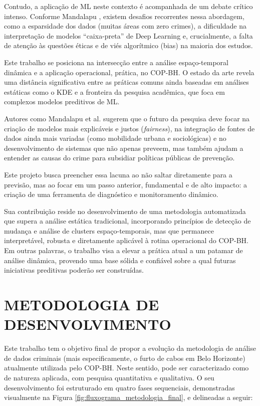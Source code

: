 Contudo, a aplicação de ML neste contexto é acompanhada de um debate crítico intenso. Conforme Mandalapu \cite{Mandalapu2023}, existem desafios recorrentes nessa abordagem, como a esparsidade dos dados (muitas áreas com zero crimes), a dificuldade na interpretação de modelos ``caixa-preta'' de Deep Learning e, crucialmente, a falta de atenção às questões éticas e de viés algorítmico (bias) na maioria dos estudos.

Este trabalho se posiciona na intersecção entre a análise espaço-temporal dinâmica e a aplicação operacional, prática, no COP-BH. O estado da arte revela uma distância significativa entre as práticas comuns ainda baseadas em análises estáticas como o KDE e a fronteira da pesquisa acadêmica, que foca em complexos modelos preditivos de ML. 

Autores como Mandalapu et al. \cite{Mandalapu2023} sugerem que o futuro da pesquisa deve focar na criação de modelos mais explicáveis e justos (\textit{fairness}), na integração de fontes de dados ainda mais variadas (como mobilidade urbana e sociológicas) e no desenvolvimento de sistemas que não apenas preveem, mas também ajudam a entender as causas do crime para subsidiar políticas públicas de prevenção.

Este projeto busca preencher essa lacuna ao não saltar diretamente para a previsão, mas ao focar em um passo anterior, fundamental e de alto impacto: a criação de uma ferramenta de diagnóstico e monitoramento dinâmico. 

Sua contribuição reside no desenvolvimento de uma metodologia automatizada que supera a análise estática tradicional, incorporando princípios de detecção de mudança e análise de clusters espaço-temporais, mas que permanece interpretável, robusta e diretamente aplicável à rotina operacional do COP-BH. Em outras palavras, o trabalho visa a elevar a prática atual a um patamar de análise dinâmica, provendo uma base sólida e confiável sobre a qual futuras iniciativas preditivas poderão ser construídas.

\section{METODOLOGIA DE DESENVOLVIMENTO}
\label{sec:metodologia}
Este trabalho tem o objetivo final de propor a evolução da metodologia de análise de dados criminais (mais especificamente, o furto de cabos em Belo Horizonte) atualmente utilizada pelo COP-BH. Neste sentido, pode ser caracterizado como de natureza aplicada, com pesquisa quantitativa e qualitativa. O seu desenvolvimento foi estruturado em quatro fases sequenciais, demonstradas visualmente na Figura \ref{fig:fluxograma_metodologia_final}, e delineadas a seguir:

